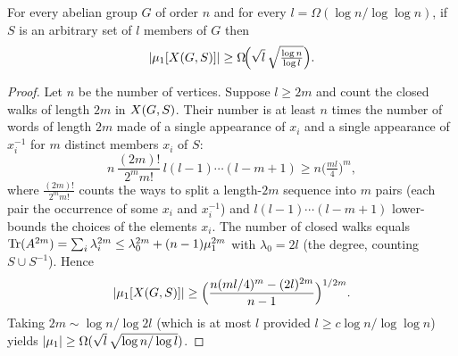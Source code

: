 \begin{proposition}
  \label{prop:prop7prime}
  For every abelian group $G$ of order $n$ and for every
  $l = \Omega(\log n / \log\log n)$, if $S$ is an arbitrary set of $l$ members of
  $G$ then
  \[
    |\mu_{1}[X(G,S)]| \ge \Omega\!\Big(\sqrt{l}\,\sqrt{\tfrac{\log n}{\log l}}\Big).
  \]
\end{proposition}
\begin{proof}
  Let $n$ be the number of vertices. Suppose $l \ge 2m$ and count the closed
  walks of length $2m$ in $X(G,S)$. Their number is at least $n$ times the
  number of words of length $2m$ made of a single appearance of $x_i$ and a
  single appearance of $x_i^{-1}$ for $m$ distinct members $x_i$ of $S$:
  \[
    n\,\frac{(2m)!}{2^{m} m!}\,l(l-1)\cdots(l-m+1) \ge n\Big(\tfrac{ml}{4}\Big)^{m},
  \]
  where $\frac{(2m)!}{2^{m}m!}$ counts the ways to split a length-$2m$ sequence
  into $m$ pairs (each pair the occurrence of some $x_i$ and $x_i^{-1}$) and
  $l(l-1)\cdots(l-m+1)$ lower-bounds the choices of the elements $x_i$. The
  number of closed walks equals $\operatorname{Tr}(A^{2m}) = \sum_i \lambda_i^{2m}
  \le \lambda_0^{2m} + (n-1)\mu_{1}^{2m}$ with $\lambda_0 = 2l$ (the degree,
  counting $S \cup S^{-1}$). Hence
  \[
    |\mu_{1}[X(G,S)]| \ge \Big(\frac{n(ml/4)^{m} - (2l)^{2m}}{n-1}\Big)^{1/2m}.
  \]
  Taking $2m \sim \log n / \log 2l$ (which is at most $l$ provided
  $l \ge c\log n/\log\log n$) yields
  $|\mu_{1}| \ge \Omega(\sqrt{l}\,\sqrt{\log n / \log l})$.
\end{proof}
